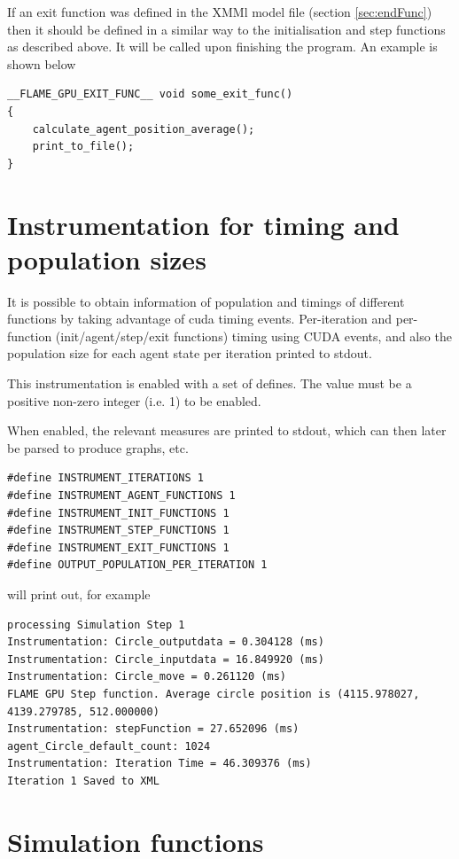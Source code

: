 \documentclass[11pt, a4paper, onecolumn, oneside]{report}
\begin{document}
If an exit function was defined in the XMMl model file (section \ref{sec:endFunc}) then it should be defined in a similar way to the initialisation and step functions as described above. It will be called upon finishing the program. An example is shown below

\begin{lstlisting}[language=C_]
__FLAME_GPU_EXIT_FUNC__ void some_exit_func()
{
    calculate_agent_position_average();
    print_to_file();
}
\end{lstlisting}

\section{Instrumentation for timing and population sizes}
\label{sec:TimingAndPop}

It is possible to obtain information of population and timings of different functions by taking advantage of cuda timing events. Per-iteration and per-function (init/agent/step/exit functions) timing using CUDA events, and also the population size for each agent state per iteration printed to stdout.

This instrumentation is enabled with a set of defines. The value must be a positive non-zero integer (i.e. 1) to be enabled.

When enabled, the relevant measures are printed to stdout, which can then later be parsed to produce graphs, etc.

\begin{lstlisting}[language=C_]
#define INSTRUMENT_ITERATIONS 1
#define INSTRUMENT_AGENT_FUNCTIONS 1
#define INSTRUMENT_INIT_FUNCTIONS 1
#define INSTRUMENT_STEP_FUNCTIONS 1
#define INSTRUMENT_EXIT_FUNCTIONS 1
#define OUTPUT_POPULATION_PER_ITERATION 1
\end{lstlisting}

will print out, for example
\begin{lstlisting}[language=C_]
processing Simulation Step 1
Instrumentation: Circle_outputdata = 0.304128 (ms)
Instrumentation: Circle_inputdata = 16.849920 (ms)
Instrumentation: Circle_move = 0.261120 (ms)
FLAME GPU Step function. Average circle position is (4115.978027, 4139.279785, 512.000000)
Instrumentation: stepFunction = 27.652096 (ms)
agent_Circle_default_count: 1024
Instrumentation: Iteration Time = 46.309376 (ms)
Iteration 1 Saved to XML
\end{lstlisting}

\section{Simulation functions}
\end{document}
